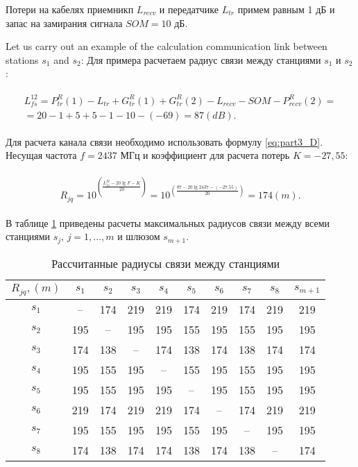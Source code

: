 Потери на кабелях приемникп $ L_{recv} $ и передатчике $ L_{tr} $ примем равным 1 дБ и запас на замирания сигнала $ SOM = 10 $ дБ.

Let us carry out an example of the calculation communication link between stations $ s_1 $ and $ s_2 $:
Для примера расчетаем радиус связи между станциями $ s_1 $ и $ s_2 $:

\begin{align}
  \begin{aligned}
  L_{fs}^{12} = P_{tr}^R(1) - L_{tr} + G_{tr}^R(1) + G_{tr}^R(2) - L_{recv} - SOM - P_{recv}^R(2)= \\
  = 20 - 1 + 5 + 5 - 1 - 10 - (-69) = 87 (dB).
  \end{aligned}
\end{align}

Для расчета канала связи необходимо использовать формулу \cref{eq:part3_D}. Несущая частота $ f = 2437 $ МГц и коэффициент для расчета потерь $ K = -27,55 $:

\begin{align}
  \begin{aligned}
  R_{jq} = 10^{\left(\frac{L_{fs}^{jq} - 20\lg{F} - K}{20}\right)}
  = 10^{\left(\frac{87 - 20\lg{2437} - (-27.55)}{20}\right)} = 174 (m).
  \end{aligned}
\end{align}

В таблице \cref{tab:part3_Rjq} приведены расчеты максимальных радиусов связи между всеми станциями $ s_j $, $ j = 1, ..., m $ и шлюзом $ s_ {m + 1} $.

\begin{table}[h!]\centering
  \begin{tabular}{|c||c|c|c|c|c|c|c|c|c|}\hline
      $R_{jq}, (m)$ & $s_1$ & $s_2$ & $s_3$ & $s_4$ & $s_5$ & $s_6$ & $s_7$ & $s_8$ & $s_{m+1}$ \\ \hline \hline

      $s_1$ &--& 174& 219& 219& 174& 219& 174& 219& 219\\ 
      $s_2$ &195& --& 195& 195& 155& 195& 155& 195& 195\\ 
      $s_3$ &174& 138& --& 174& 138& 174& 138& 174& 174\\ 
      $s_4$ &195& 155& 195& --& 155& 195& 155& 195& 195\\ 
      $s_5$ &195& 155& 195& 195& --& 195& 155& 195& 195\\ 
      $s_6$ &219& 174& 219& 219& 174& --& 174& 219& 219\\
      $s_7$ &195& 155& 195& 195& 155& 195& --& 195& 195\\ 
      $s_8$ &174& 138& 174& 174& 138& 174& 138& --& 174\\ 
      \hline

\end{tabular}\caption{Рассчитанные радиусы связи между станциями}\label{tab:part3_Rjq}
\end{table}

